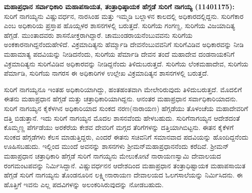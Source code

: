 \textbf{ಮಹಾಪ್ರಧಾನ ಸರ್ವಾಧಿಕಾರಿ ಮಹಾಪಸಾಯತ, ತಂತ್ರಾಧಿಷ್ಠಾಯಕ ಹೆಗ್ಗಡೆ ಸುರಿಗೆ ನಾಗಯ್ಯ (1140\general{\enginline{-}}1175):} ಸುರಿಗೆ ನಾಗಯ್ಯನು ವಿಷ್ಣುವರ್ಧನ, ನಾರಸಿಂಹ ಮತ್ತು ಇಮ್ಮಡಿ ಬಲ್ಲಾಳನ ಕಾಲದಲ್ಲಿ ಅಧಿಕಾರದಲ್ಲಿದ್ದನು. ಸುರಿಗೆಕಾರ ಎಂಬ ಅಧಿಕಾರಿಯ ಪ್ರಸ್ತಾಪ ಹೊಯ್ಸಳರ ಶಾಸನಗಳಲ್ಲಿ ಬರುತ್ತದೆ. ಸುರಿಗೆಯ ಗಂಗಣ್ಣ, ಸುರಿಗೆಯ ವಿಜಯಾದಿತ್ಯ ಹೆಗ್ಗಡೆ. ಮುಂತಾದವರು ಶಾಸನೋಕ್ತರಾಗಿದ್ದಾರೆ. ಚಾಮುಂಡರಾಯನೆಂಬುವವನು ಸುರಿಗೆಯ ಅಂಕಕಾರನಾಗಿದ್ದನೆಂದು\break ಹೇಳಿದೆ. ವಿಕ್ರಮಾದಿತ್ಯನು ಹೆರ್ಮ್ಮಾಡಿ ದೇವನೆಂಬುವವನಿಗೆ ಸುರಿಗೆವಿಡಿವ ಅಧಿಕಾರವನ್ನು ನೀಡಿ ಮಹಾಮಾತ್ಯ ಪದವಿಯನ್ನು ನೀಡಿದನೆಂದು, ಸುರಿಗೆಯ ಪೆರ್ಮಾಡಿ ದೇವನ ತಂದೆ ಮಹಾದೇವ ದಂಡನಾಯಕನಿಗೆ ವಿಕ್ರಮಾದಿತ್ಯನು ಸುರಿಗೆವಿಡಿವ ಅಧಿಕಾರವನ್ನು ನೀಡಿದ್ದನೆಂದು ತಿಳಿದುಬರುತ್ತದೆ. ಸುರಿಗೆಯ ಲೆಂಕಮಹಾದೇವ, ಸುರಿಗೆಯ ಪೆರ್ಮಾಡಿ, ಸುರಿಗೆಯ ನಾಗರಸ ಈ ಅಧಿಕಾರಿಗಳ ಉಲ್ಲೇಖ ವಿಕ್ರಮಾದಿತ್ಯನ ಶಾಸನಗಳಲ್ಲಿ ಬರುತ್ತದೆ.

ಸುರಿಗೆ ನಾಗಯ್ಯನೂ ಇಂತಹ ಅಧಿಕಾರಿಯಾಗಿದ್ದು, ಹಂತಹಂತವಾಗಿ ಮೇಲೇರಿರುವುದು ತಿಳಿದುಬರುತ್ತದೆ. ಮೊದಲಿಗೆ ಈತನು ಮಹಾಪ್ರಧಾನ ಹೆಗ್ಗಡೆ ಮತ್ತು ಚತ್ರಾಧಿಕಾರಿಯಾಗಿದ್ದನು. ಆನಂತರ ಮಹಾಪ್ರಧಾನ ಸರ್ವಾಧಿಕಾರಿಯಾದನು. ಸುರಿಗೆ ನಾಗಯ್ಯನ ಕೈಕೆಳಗಿನ ಅಧಿಕಾರಿಯಾದ ಸುಂಕದ ನರಣ(ನಾರಾಯಣ) ಹೆಗ್ಗಡೆಯು ತೊಳಂಚೆಯ ಮಹಾದೇವರಿಗೆ ದತ್ತಿ ಬಿಡುತ್ತಾನೆ. ಇದು ಸುರಿಗೆ ನಾಗಯ್ಯನ ಮೊದಲ ಶಾಸನವೆಂದು ಹೇಳಬಹುದು. ಸುರಿಗೆನಾಗಯ್ಯನ ಆದೇಶದಂತೆ ಕೊಮ್ಮಣ್ಣ ಪೆರ್ಗಡೆಯು ಅರಕೆರೆಯ ಕೇಶವ ದೇವರಿಗೆ ಮಗ್ಗದ ತೆರಿಗೆಗಳನ್ನು ದತ್ತಿಯಾಗಿಬಿಟ್ಟನು. ಈತನ ಕೈಕೆಳಗೆ ಸುಂಕದ ಹೆಗ್ಗಡೆಗಳು ಕೆಲಸ ಮಾಡುತ್ತಿದ್ದರು, ಎಂದರೆ ಈತನು ಸಚಿವನಿಗೆ ಸಮಾನವಾದ ಪದವಿಯನ್ನು ಹೊಂದಿದ್ದನೆಂದು ಊಹಿಸಬಹುದು. ಇಲ್ಲಿಂದ ಮುಂದೆ ಅವನನ್ನು ಶಾಸನಗಳು ಶ‍್ರೀಮನ್​ಮಹಾಪ್ರಧಾನನೆಂದು ಕರೆದಿವೆ. ಶ‍್ರೀಮನ್​ಮಹಾಪ್ರಧಾನ ಚತ್ರಾಧಿಕಾರಿ ಹೆಗ್ಗಡೆ ಸುರಿಗೆ ನಾಗಯ್ಯನು ಮೇಲುಕೋಟೆ ನಾರಾಯಣಸ್ವಾಮಿ ದೇವಾಲಯದ ರಂಗಮಂಟಪವನ್ನು ನಿರ್ಮಿಸಿದ್ದಾನೆ. ವಿಷ್ಣುವರ್ಧನನ ಆದೇಶದಿಂದ ಮಹಾಪ್ರಧಾನ ತಂತ್ರಾಧಿಷ್ಟಾಯಕ ಮಹಾಪಸಾಯಿತ ಹೆಗ್ಗಡೆ ಸುರಿಗೆ ನಾಗಯ್ಯನು ತೊಂಡನೂರಿನ ಲಕ್ಷ್ಮೀನಾರಾಯಣ ದೇವಾಲಯದ ಓಲಗಸಾಲೆಯನ್ನು ನಿರ್ಮಿಸಿದನು. ಈ ಹೊತ್ತಿಗೆ ಇವನು ಎಲ್ಲ ಪದವಿಗಳನ್ನು ಅಲಂಕರಿಸಿರುವುದನ್ನು ನೋಡಬಹುದು.


